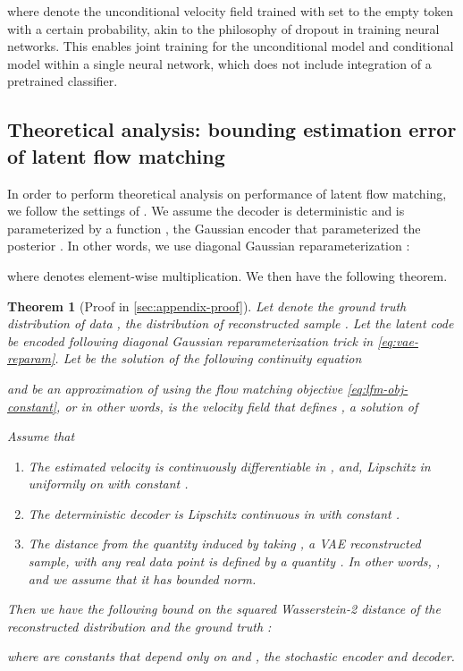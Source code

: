 \documentclass{article}
\theoremstyle{plain}
\newtheorem{theorem}{Theorem}[section]
\theoremstyle{definition}
\theoremstyle{remark}
\begin{document}
where  denote the unconditional velocity field trained with  set to the empty token with a certain probability, akin to the philosophy of dropout in training neural networks.
This enables joint training for the unconditional model and conditional model within a single neural network, which does not include integration of a pretrained classifier.



\subsection{Theoretical analysis: bounding estimation error of latent flow matching}
\label{ssec:theory}
In order to perform theoretical analysis on performance of latent flow matching, we follow the settings of \cite{camuto21towards,kumar2020implicit}.
We assume the decoder is deterministic and is parameterized by a function , the Gaussian encoder that parameterized the posterior .
In other words, we use diagonal Gaussian reparameterization \cite{kingma2013auto}:

where  denotes element-wise multiplication.
We then have the following theorem.
\begin{theorem}[Proof in \cref{sec:appendix-proof}]
  \label{thm:wasserstein-bound}
  Let  denote the ground truth distribution of data
  ,  the distribution of reconstructed sample
  .
Let the latent code  be encoded following diagonal Gaussian reparameterization trick in \eqref{eq:vae-reparam}.
Let  be the solution of the following continuity equation
  
and  be an approximation of  using the flow matching objective \eqref{eq:lfm-obj-constant}, or in other words,  is the velocity field that defines , a solution of

Assume that
\begin{enumerate}
    \item The estimated velocity  is continuously differentiable in , and, Lipschitz in  uniformily on  with constant .
   \item The deterministic decoder  is Lipschitz continuous in  with constant .
    \item The distance from the quantity induced by taking  , \ie a VAE reconstructed sample, with any real data point  is defined by a quantity . In other words, , and we assume that it has bounded  norm.
  \end{enumerate}
Then we have the following bound on the squared Wasserstein-2 distance of the
  reconstructed distribution  and the ground truth :

where  are constants that depend only on  and , the stochastic encoder and decoder.
\end{theorem}
\end{document}
